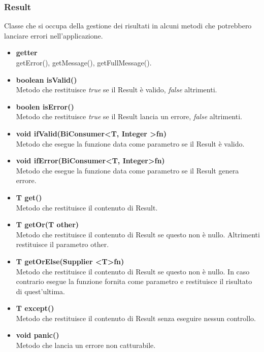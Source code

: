 \documentclass[a4paper, 12pt]{scrreprt}
\begin{document}
				\subsubsection{Result}
				Classe che si occupa della gestione dei risultati in alcuni metodi che potrebbero lanciare errori nell'applicazione.\\
				\begin{itemize}
					\item \textbf{getter}
					\\getError(), getMessage(), getFullMessage().
					
					\item\textbf{boolean isValid()}
					\\Metodo che restituisce \textit{true} se il Result \`e valido, \textit{false} altrimenti.
					
					\item\textbf{boolen isError()}
					\\Metodo che restituisce \textit{true} se il Result lancia un errore, \textit{false} altrimenti.
	
					\item\textbf{void ifValid(BiConsumer\textless T, Integer \textgreater fn)}
					\\Metodo che esegue la funzione data come parametro se il Result \`e valido.
	
					\item\textbf{void ifError(BiConsumer\textless T, Integer\textgreater fn)}
					\\Metodo che esegue la funzione data come parametro se il Result genera errore.
	
					\item \textbf{T get()}
					\\Metodo che restituisce il contenuto di Result.
	
					\item \textbf{T getOr(T other)}
					\\Metodo che restituisce il contenuto di Result se questo non \`e nullo. Altrimenti restituisce il parametro other.
	
					\item \textbf{T getOrElse(Supplier \textless T\textgreater fn)}
					\\Metodo che restituisce il contenuto di Result se questo non \`e nullo. In caso contrario esegue la funzione fornita come parametro e restituisce il risultato di quest'ultima.
	
					\item  \textbf{T except()}
					\\Metodo che restituisce il contenuto di Result senza eseguire nessun controllo.
	
					\item \textbf{void panic()}
					\\Metodo che lancia un errore non catturabile.
				\end{itemize}
\end{document}
